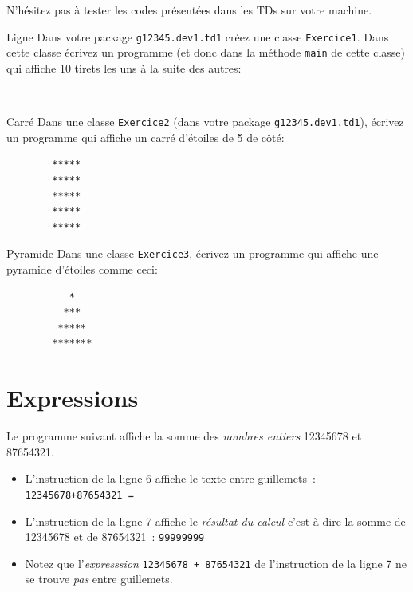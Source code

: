 \documentclass[a4paper,11pt]{article}
\begin{document}
	N'hésitez pas à tester les codes présentées dans les TDs sur votre machine.



	\begin{Exercice}{Ligne}
		Dans votre package \texttt{g12345.dev1.td1} créez une classe \texttt{Exercice1}.
		Dans cette classe écrivez un programme  (et donc dans la méthode \texttt{main} de cette classe) 
		qui affiche 10 tirets les uns à la suite des autres:

		\texttt{- - - - - - - - - -}
	\end{Exercice}
	
	\begin{Exercice}{Carré}
		Dans une classe \texttt{Exercice2} (dans votre package \texttt{g12345.dev1.td1}), écrivez un programme qui affiche un carré d'étoiles de 5 de côté:

		\begin{verbatim}
		*****
		*****
		*****
		*****
		*****
		\end{verbatim}
	\end{Exercice}

	\begin{Exercice}{Pyramide}
		Dans une classe \texttt{Exercice3}, écrivez un programme qui affiche une pyramide d'étoiles comme ceci:

		\begin{verbatim}
		   *
		  ***
		 *****
		*******
		\end{verbatim}
	\end{Exercice}



\section{Expressions}

	Le programme suivant affiche la somme des \emph{nombres entiers}  12345678 et 87654321.
	

	\begin{itemize}
		\item	L'instruction de la ligne 6 affiche le texte entre guillemets~: \texttt{12345678+87654321 = }
	
		\item L'instruction de la ligne 7 affiche le \emph{résultat du calcul} 
			c'est-à-dire la somme de 12345678 et de 87654321~:  \texttt{99999999}
	
		\item Notez que l'\emph{expresssion} \texttt{12345678 + 87654321} 
			de l'instruction de la ligne 7 ne se trouve \emph{pas} entre guillemets.
	\end{itemize}
	
\end{document}
